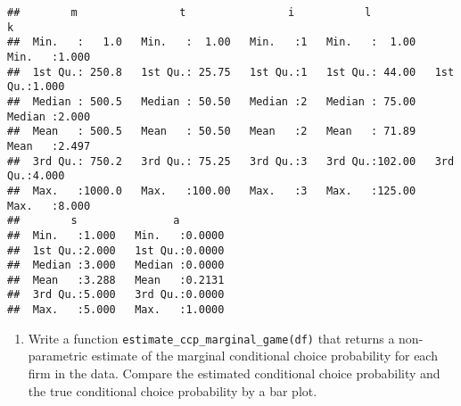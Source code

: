 \documentclass[
]{book}
\providecommand{\tightlist}{%
  \setlength{\itemsep}{0pt}\setlength{\parskip}{0pt}}
\begin{document}
\begin{verbatim}
##        m                t                i           l                k        
##  Min.   :   1.0   Min.   :  1.00   Min.   :1   Min.   :  1.00   Min.   :1.000  
##  1st Qu.: 250.8   1st Qu.: 25.75   1st Qu.:1   1st Qu.: 44.00   1st Qu.:1.000  
##  Median : 500.5   Median : 50.50   Median :2   Median : 75.00   Median :2.000  
##  Mean   : 500.5   Mean   : 50.50   Mean   :2   Mean   : 71.89   Mean   :2.497  
##  3rd Qu.: 750.2   3rd Qu.: 75.25   3rd Qu.:3   3rd Qu.:102.00   3rd Qu.:4.000  
##  Max.   :1000.0   Max.   :100.00   Max.   :3   Max.   :125.00   Max.   :8.000  
##        s               a         
##  Min.   :1.000   Min.   :0.0000  
##  1st Qu.:2.000   1st Qu.:0.0000  
##  Median :3.000   Median :0.0000  
##  Mean   :3.288   Mean   :0.2131  
##  3rd Qu.:5.000   3rd Qu.:0.0000  
##  Max.   :5.000   Max.   :1.0000
\end{verbatim}

\begin{enumerate}
\def\labelenumi{\arabic{enumi}.}
\setcounter{enumi}{13}
\tightlist
\item
  Write a function \texttt{estimate\_ccp\_marginal\_game(df)} that returns a non-parametric estimate of the marginal conditional choice probability for each firm in the data. Compare the estimated conditional choice probability and the true conditional choice probability by a bar plot.
\end{enumerate}
\end{document}

